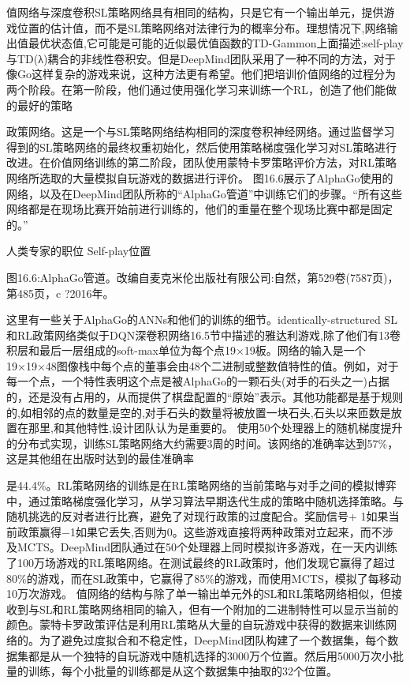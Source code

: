 值网络与深度卷积SL策略网络具有相同的结构，只是它有一个输出单元，提供游戏位置的估计值，而不是SL策略网络对法律行为的概率分布。理想情况下,网络输出值最优状态值,它可能是可能的近似最优值函数的TD-Gammon上面描述:self-play与TD(λ)耦合的非线性卷积安。但是DeepMind团队采用了一种不同的方法，对于像Go这样复杂的游戏来说，这种方法更有希望。他们把培训价值网络的过程分为两个阶段。在第一阶段，他们通过使用强化学习来训练一个RL，创造了他们能做的最好的策略

政策网络。这是一个与SL策略网络结构相同的深度卷积神经网络。通过监督学习得到的SL策略网络的最终权重初始化，然后使用策略梯度强化学习对SL策略进行改进。在价值网络训练的第二阶段，团队使用蒙特卡罗策略评价方法，对RL策略网络所选取的大量模拟自玩游戏的数据进行评价。
图16.6展示了AlphaGo使用的网络，以及在DeepMind团队所称的“AlphaGo管道”中训练它们的步骤。“所有这些网络都是在现场比赛开始前进行训练的，他们的重量在整个现场比赛中都是固定的。”
 
人类专家的职位 					Self-play位置

图16.6:AlphaGo管道。改编自麦克米伦出版社有限公司:自然，第529卷(7587页)，第485页，c ?2016年。


这里有一些关于AlphaGo的ANNs和他们的训练的细节。identically-structured SL和RL政策网络类似于DQN深卷积网络16.5节中描述的雅达利游戏,除了他们有13卷积层和最后一层组成的soft-max单位为每个点19×19板。网络的输入是一个19×19×48图像栈中每个点的董事会由48个二进制或整数值特性的值。例如，对于每一个点，一个特性表明这个点是被AlphaGo的一颗石头(对手的石头之一)占据的，还是没有占用的，从而提供了棋盘配置的“原始”表示。其他功能都是基于规则的,如相邻的点的数量是空的,对手石头的数量将被放置一块石头,石头以来匝数是放置在那里,和其他特性,设计团队认为是重要的。
使用50个处理器上的随机梯度提升的分布式实现，训练SL策略网络大约需要3周的时间。该网络的准确率达到57\%，这是其他组在出版时达到的最佳准确率

是44.4\%。RL策略网络的训练是在RL策略网络的当前策略与对手之间的模拟博弈中，通过策略梯度强化学习，从学习算法早期迭代生成的策略中随机选择策略。与随机挑选的反对者进行比赛，避免了对现行政策的过度配合。奖励信号+ 1如果当前政策赢得−1如果它丢失,否则为0。这些游戏直接将两种政策对立起来，而不涉及MCTS。DeepMind团队通过在50个处理器上同时模拟许多游戏，在一天内训练了100万场游戏的RL策略网络。在测试最终的RL政策时，他们发现它赢得了超过80\%的游戏，而在SL政策中，它赢得了85\%的游戏，而使用MCTS，模拟了每移动10万次游戏。
值网络的结构与除了单一输出单元外的SL和RL策略网络相似，但接收到与SL和RL策略网络相同的输入，但有一个附加的二进制特性可以显示当前的颜色。蒙特卡罗政策评估是利用RL策略从大量的自玩游戏中获得的数据来训练网络的。为了避免过度拟合和不稳定性，DeepMind团队构建了一个数据集，每个数据集都是从一个独特的自玩游戏中随机选择的3000万个位置。然后用5000万次小批量的训练，每个小批量的训练都是从这个数据集中抽取的32个位置。

